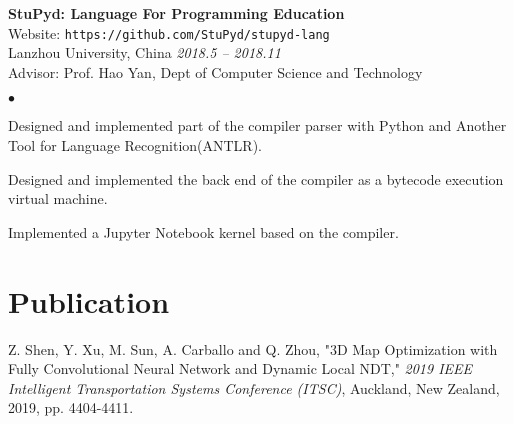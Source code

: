 \documentclass[margin,line,pifont,palatino,courier]{res}
\newenvironment{list2}{
	\begin{list}{$\bullet$}{%
			\setlength{\itemsep}{0in}
			\setlength{\parsep}{0in} \setlength{\parskip}{0in}
			\setlength{\topsep}{0in} \setlength{\partopsep}{0in}
			\setlength{\leftmargin}{0.2in}}}{\end{list}}
\begin{document}
\begin{resume}
		{\bf StuPyd: Language For Programming Education} \\
		Website: \verb+https://github.com/StuPyd/stupyd-lang+ \\
		Lanzhou University, China \hfill {\sl 2018.5 -- 2018.11} \\
		Advisor: Prof. Hao Yan, Dept of Computer Science and Technology 
		\begin{list2}
			\item Designed and implemented part of the compiler parser with Python and Another Tool for Language Recognition(ANTLR).
			\item Designed and implemented the back end of the compiler as a bytecode execution virtual machine.
			\item Implemented a Jupyter Notebook kernel based on the compiler. 
		\end{list2}	
		

		\section{\sc Publication}
			
			\begin{enumerate}[{[1]}]
				\item Z. Shen, Y. Xu, M. Sun, A. Carballo and Q. Zhou, "3D Map Optimization with Fully Convolutional Neural Network and Dynamic Local NDT," \textsl{2019 IEEE Intelligent Transportation Systems Conference (ITSC)}, Auckland, New Zealand, 2019, pp. 4404-4411.
			\end{enumerate}
		

\end{resume}
\end{document}
